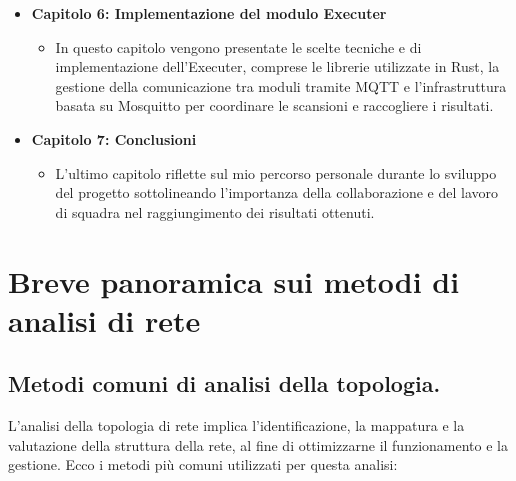 \documentclass[target=bach,aauheader=,style=]{thud}
\begin{document}
\begin{itemize}
  \item \textbf{Capitolo 6: Implementazione del modulo Executer}
    \begin{itemize}
      \item[] In questo capitolo vengono presentate le scelte tecniche e di implementazione dell'Executer, comprese le librerie utilizzate in Rust, la gestione della comunicazione tra moduli tramite MQTT e l'infrastruttura basata su Mosquitto per coordinare le scansioni e raccogliere i risultati.
    \end{itemize}

  \item \textbf{Capitolo 7: Conclusioni}
    \begin{itemize}
      \item[] L'ultimo capitolo riflette sul mio percorso personale durante lo sviluppo del progetto sottolineando l'importanza della collaborazione e del lavoro di squadra nel raggiungimento dei risultati ottenuti. 
    \end{itemize}

\end{itemize}


\chapter{Breve panoramica sui metodi di analisi di rete}
\label{art}
\section{Metodi comuni di analisi della topologia.}
L'analisi della topologia di rete implica l'identificazione, la mappatura e la valutazione della struttura della rete, al fine di ottimizzarne il funzionamento e la gestione. Ecco i metodi più comuni utilizzati per questa analisi:
\end{document}
